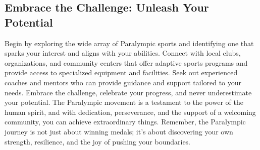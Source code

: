 \subsection{Embrace the Challenge: Unleash Your Potential}

Begin by exploring the wide array of Paralympic sports and identifying one that sparks your interest and aligns with your abilities.  Connect with local clubs, organizations, and community centers that offer adaptive sports programs and provide access to specialized equipment and facilities.  Seek out experienced coaches and mentors who can provide guidance and support tailored to your needs. Embrace the challenge, celebrate your progress, and never underestimate your potential. The Paralympic movement is a testament to the power of the human spirit, and with dedication, perseverance, and the support of a welcoming community, you can achieve extraordinary things.  Remember, the Paralympic journey is not just about winning medals; it's about discovering your own strength, resilience, and the joy of pushing your boundaries.